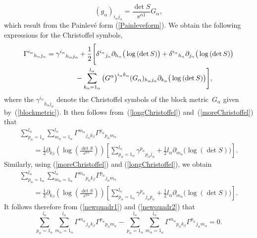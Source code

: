 \documentclass[pdftex]{sigma}
\numberwithin{equation}{section}
\newcommand{\ialpha}{i_{\alpha}}
\newcommand{\jalpha}{j_{\alpha}}
\newcommand{\kbeta}{k_{\beta}}
\newcommand{\malpha}{m_{\alpha}}
\newcommand{\lalpha}{l_{\alpha}}
\newcommand{\palpha}{p_{\alpha}}
\newcommand{\kalpha}{k_{\alpha}}
\newcommand{\halpha}{h_{\alpha}}
\begin{document}
\[
(g_{\alpha})_{\ialpha \jalpha}=\frac{\det S}{s^{\alpha 1}}G_{\alpha},
\]
which result from the Painlev\'e form (\ref{Painleveform}). We obtain the following expressions for the Christoffel symbols,
\begin{gather}
{\Gamma^{\ialpha}}_{\halpha \jalpha}={\gamma^{\ialpha}}_{\halpha \jalpha} +\frac{1}{2}\Bigg[ {\delta^{\ialpha}}_{\jalpha}\partial_{\halpha}\big(\log{(\det S)}\big)+{\delta^{\ialpha}}_{\halpha}\partial_{\jalpha}\big(\log{(\det S)}\big)\nonumber\\
\hphantom{{\Gamma^{\ialpha}}_{\halpha \jalpha}=}{}-\sum_{\kalpha = 1_{\alpha}}^{\lalpha}\big(G^{\alpha}\big)^{\ialpha \kalpha}(G_{\alpha})_{\halpha \jalpha}\partial_{\kalpha}\big(\log{(\det S)}\big)\Bigg],\label{longChristoffel}
\end{gather}
where the ${\gamma^{\ialpha}}_{\halpha \jalpha}$ denote the Christoffel symbols of the block metric~$G_{\alpha}$ given by~(\ref{blockmetric}). It then follows from~(\ref{longChristoffel}) and~(\ref{moreChristoffel}) that
\begin{gather}
\sum_{\palpha=1_{\alpha}}^{\lalpha}\sum_{\malpha = 1_{\alpha}}^{\lalpha}{\Gamma^{\malpha}}_{\jalpha \kbeta}{\Gamma^{\palpha}}_{\palpha \malpha}\nonumber\\
\qquad{} =\frac{1}{2}\partial_{\kbeta}\left(\log\left(\frac{\det S}{s^{\alpha 1}}\right)\right)\left[\sum_{\palpha=1_{\alpha}}^{\lalpha}{\gamma^{\palpha}}_{\palpha \jalpha}+\frac{1}{2}\lalpha \partial_{\malpha}\big(\log{(\det S)}\big)\right].\label{newquadr1}
\end{gather}
Similarly, using (\ref{moreChristoffel}) and (\ref{longChristoffel}), we obtain
\begin{gather}
\sum_{\palpha=1_{\alpha}}^{\lalpha}\sum_{\malpha=1_{\alpha}}^{\lalpha}{\Gamma^{\malpha}}_{\palpha \kbeta}{\Gamma^{\palpha}}_{\jalpha \malpha}\nonumber\\
\qquad{} =\frac{1}{2}\partial_{\kbeta}\left(\log\left(\frac{\det S}{s^{\alpha 1}}\right)\right)\left[\sum_{\palpha=1_{\alpha}}^{\lalpha}{\gamma^{\palpha}}_{\jalpha \palpha}+\frac{1}{2}\lalpha \partial_{\malpha}\big(\log{(\det S)}\big)\right].\label{newquadr2}
\end{gather}
It follows therefore from (\ref{newquadr1}) and (\ref{newquadr2}) that
\[
\sum_{\palpha=1_{\alpha}}^{\lalpha}\sum_{\malpha = 1_{\alpha}}^{\lalpha}{\Gamma^{\malpha}}_{\jalpha \kbeta}{\Gamma^{\palpha}}_{\palpha \malpha}-\sum_{\palpha=1_{\alpha}}^{\lalpha}\sum_{\malpha=1_{\alpha}}^{\lalpha}{\Gamma^{\malpha}}_{\palpha \kbeta}{\Gamma^{\palpha}}_{\jalpha \malpha}=0.
\]
\end{document}
